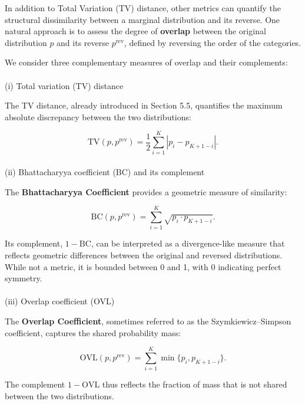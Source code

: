 \documentclass[
  12pt,
]{article}
\makeatletter
\let\oldparagraph\paragraph
\renewcommand{\paragraph}{
    \@ifstar
      \xxxParagraphStar
      \xxxParagraphNoStar
  }
\newcommand{\xxxParagraphStar}[1]{\oldparagraph*{#1}\mbox{}}
\newcommand{\xxxParagraphNoStar}[1]{\oldparagraph{#1}\mbox{}}
\theoremstyle{plain}
\theoremstyle{definition}
\theoremstyle{remark}
\makeatother
\begin{document}
In addition to Total Variation (TV) distance, other metrics can quantify
the structural dissimilarity between a marginal distribution and its
reverse. One natural approach is to assess the degree of
\textbf{overlap} between the original distribution \(p\) and its reverse
\(p^{\mathrm{rev}}\), defined by reversing the order of the categories.

We consider three complementary measures of overlap and their
complements:

\paragraph{(i) Total variation (TV)
distance}\label{i-total-variation-tv-distance}

The TV distance, already introduced in Section 5.5, quantifies the
maximum absolute discrepancy between the two distributions:

\[
\text{TV}(p, p^{\mathrm{rev}}) = \frac{1}{2} \sum_{i=1}^{K} \left| p_i - p_{K+1 - i} \right|.
\]

\paragraph{(ii) Bhattacharyya coefficient (BC) and its
complement}\label{ii-bhattacharyya-coefficient-bc-and-its-complement}

The \textbf{Bhattacharyya Coefficient} provides a geometric measure of
similarity:

\[
\text{BC}(p, p^{\mathrm{rev}}) = \sum_{i=1}^{K} \sqrt{ p_i \cdot p_{K+1 - i} }.
\]

Its complement, \(1 - \text{BC}\), can be interpreted as a
divergence-like measure that reflects geometric differences between the
original and reversed distributions. While not a metric, it is bounded
between 0 and 1, with 0 indicating perfect symmetry.

\paragraph{(iii) Overlap coefficient
(OVL)}\label{iii-overlap-coefficient-ovl}

The \textbf{Overlap Coefficient}, sometimes referred to as the
Szymkiewicz--Simpson coefficient, captures the shared probability mass:

\[
\text{OVL}(p, p^{\mathrm{rev}}) = \sum_{i=1}^{K} \min\{ p_i, p_{K+1 - i} \}.
\]

The complement \(1 - \text{OVL}\) thus reflects the fraction of mass
that is not shared between the two distributions.
\end{document}
